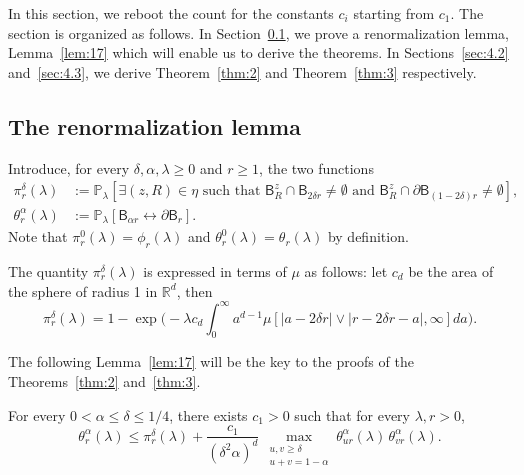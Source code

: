 \documentclass[AHL,Unicode,longabstracts]{cedram}
\begin{document}
In this section, we reboot the count for the constants $c_i$ starting from $c_1$. The section is organized as follows. In Section~\ref{sec:4.1}, we prove a renormalization lemma, Lemma~\ref{lem:17} which will enable us to derive the theorems. In Sections~\ref{sec:4.2} and~\ref{sec:4.3}, we derive Theorem~\ref{thm:2} and Theorem~\ref{thm:3} respectively.

\subsection{The renormalization lemma}\label{sec:4.1}

Introduce, for every $\delta,\alpha,\lambda\ge0$ and $r\ge1$, the two functions
\begin{align*}
\pi_r^\delta(\lambda)&:={\mathbb P}_\lambda[\exists (z,R)\in\eta\text{ such that } \mathsf B_R^z \cap \mathsf B_{2\delta r}\ne \emptyset\text{ and }\mathsf B_R^z \cap \partial \mathsf B_{(1-2\delta)r}\ne \emptyset],\\
\theta_r^\alpha(\lambda) &:= {\mathbb P}_{\lambda} [\mathsf B_{\alpha r} \longleftrightarrow \partial \mathsf B_r].
\end{align*}
Note that $\pi_r^0(\lambda)=\phi_r(\lambda)$ and $\theta_r^0(\lambda)=\theta_r(\lambda)$ by definition.

\begin{rema}
The quantity $\pi_r^\delta(\lambda)$ is expressed in terms of $\mu$ as follows: let $c_d$ be the area of the sphere of radius 1 in ${\mathbb R}^d$, then
\begin{equation}\label{eq:p1}
\pi_r^\delta(\lambda)=1-\exp\Big(-\lambda c_d \int_0^\infty a^{d-1}\mu[|a-2\delta r|\vee |r-2\delta r-a|,\infty]da\Big).
\end{equation}
\end{rema}

The following Lemma~\ref{lem:17} will be the key to the proofs of the Theorems~\ref{thm:2} and~\ref{thm:3}.
\begin{lemm}\label{lem:17}
For every $0<\alpha\le \delta\le 1/4$, there exists $c_1>0$ such that for every $\lambda,r>0$,
\begin{equation}\label{eq:14}
\theta^\alpha_r (\lambda)\le \pi_r^\delta(\lambda)+\frac{c_1}{(\delta^2\alpha)^d}\,\max_{\substack{u,v\ge\delta \\ u+v=1-\alpha}}\theta^\alpha_{ur}(\lambda)\,\theta^\alpha_{vr}(\lambda).
\end{equation}
\end{lemm}
\end{document}
